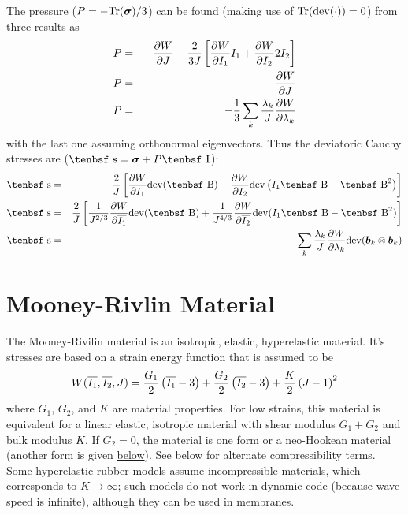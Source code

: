 \documentclass[11pt]{book}
\renewcommand{\vec}[1]{\boldsymbol{#1}}
\newcommand{\tens}[1]{\boldsymbol{\mathsf{#1}}}
\def\B{\hbox{\tenbsf B}}
\def\dev{\hbox{\tenbsf s}}
\def\I{\hbox{\tenbsf I}}
\begin{document}
The pressure ($P = -{\rm Tr}(\tens\sigma)/3$) can be found (making use of ${\rm Tr}({\rm dev}(\cdot))=0$) from three results as
\begin{eqnarray}
   P & = & -{\partial W\over \partial J} - {2\over 3J}\left[ {\partial W\over \partial I_1}I_1  + {\partial W\over \partial I_2}2I_2   \right]      \\
   P & = & - {\partial W\over \partial J} \\
   P & = &  -{1\over 3}\sum_k {\lambda_k\over J} {\partial W\over\partial \lambda_k}
\end{eqnarray}
with the last one assuming orthonormal eigenvectors.
Thus the deviatoric Cauchy stresses are ($\dev = \tens\sigma + P\I$):
\begin{eqnarray}
   \dev & = &  {2\over J}\left[ {\partial W\over \partial I_1}{\rm dev}(\B)
                                             + {\partial W\over \partial I_2}{\rm dev}\left(I_1\B- \B^2\right)
                                            \right]      \\
   \dev & = &  {2\over J}\left[ {1\over J^{2/3}}{\partial W\over \partial \overline{I_1}}{\rm dev}(\B)
                                        + {1\over J^{4/3}}{\partial W\over \partial \overline{I_2}}{\rm dev}( I_1 \B- \B^2)
                                           \right] \\
   \dev & = &  \sum_k {\lambda_k\over J} {\partial W\over\partial \lambda_k} {\rm dev}(\vec b_k\otimes\vec b_k)
\end{eqnarray}

\section{Mooney-Rivlin Material\label{MRM}}

The Mooney-Rivilin material is an isotropic, elastic, hyperelastic material. It's stresses are based on a strain energy function that is assumed to be
\begin{equation}
W(\overline{I_1},\overline{I_2},J)= {G_1\over2}\left(\overline{I_1}-3\right) + {G_2\over2}\left(\overline{I_2}-3\right) + {K\over2}\left(J-1\right)^2
\end{equation}
where $G_1$, $G_2$, and $K$ are material properties.
For low strains, this material is equivalent for a linear elastic, isotropic material with shear modulus $G_1+G_2$ and bulk modulus $K$. If $G_2=0$, the material is one form or a neo-Hookean material (another form is given \hyperref[NHM]{below}). See below for alternate compressibility terms. Some hyperelastic rubber models assume incompressible materials, which corresponds to $K\to\infty$; such models do not work in dynamic code (because wave speed is infinite), although they can be used in membranes.
\end{document}
